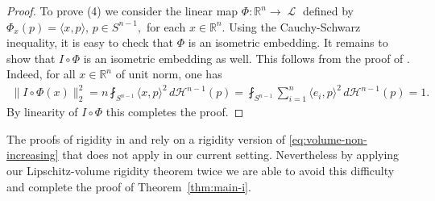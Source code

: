 \documentclass[reqno]{amsart}
\numberwithin{equation}{section}
\newcommand{\R}{\mathbb{R}}
\newcommand{\Ha}{\mathcal{H}}
\newcommand{\norm}[1]{\lVert#1\rVert}
\DeclareMathOperator{\Ell}{\mathscr{L}}
\begin{document}
\begin{proof}
To prove (4) we consider the linear map $\Phi:\R^n\to \Ell$ defined by 
\(\Phi_x(p)=\langle x,p\rangle, \, p\in S^{n-1},\)
for each $x\in\R^n$. Using the Cauchy-Schwarz inequality, it is easy to check that $\Phi$ is an isometric embedding. It remains to show that $I\circ \Phi$ is an isometric embedding as well. This follows from the proof of \cite[Lemma~4.6]{bi10}. Indeed, for all \(x\in \R^n\) of unit norm, one has
\begin{align*}
\norm{I\circ\Phi(x)}_{2}^2=n\fint_{S^{n-1}} \langle x,  p\rangle ^2 \, d\Ha^{n-1}(p)= \fint_{S^{n-1}} \sum_{i=1}^n \langle e_i,  p\rangle ^2 \, d\Ha^{n-1}(p)=1.
\end{align*}
By linearity of $I\circ \Phi$ this completes the proof.
\end{proof}
The proofs of rigidity in \cite{bi10} and \cite{bi13} rely on a rigidity version of \eqref{eq:volume-non-increasing} that does not apply in our current setting. Nevertheless by applying our Lipschitz-volume rigidity theorem twice we are able to avoid  this difficulty and complete the proof of Theorem~\ref{thm:main-i}.
\end{document}
